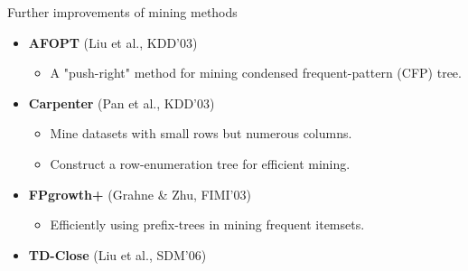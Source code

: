 \documentclass[aspectratio=169,t,xcolor=dvipsnames]{beamer}
\begin{document}
  {
    \begin{frame}{Further improvements of mining methods}
    \begin{itemize}
      \item \textbf{AFOPT} (Liu et al., KDD'03)
      \begin{itemize}
        \item A "push-right" method for mining condensed frequent-pattern (CFP) tree.
      \end{itemize}
      \item \textbf{Carpenter} (Pan et al., KDD'03)
      \begin{itemize}
        \item Mine datasets with small rows but numerous columns.
        \item Construct a row-enumeration tree for efficient mining.
      \end{itemize}
      \item \textbf{FPgrowth+} (Grahne \& Zhu, FIMI'03)
      \begin{itemize}
        \item Efficiently using prefix-trees in mining frequent itemsets.
      \end{itemize}
      \item \textbf{TD-Close} (Liu et al., SDM'06)
    \end{itemize}
    \end{frame}
  }
\end{document}
